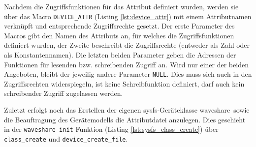 Nachdem die Zugriffsfunktionen für das Attribut definiert wurden, werden sie über das Macro \texttt{DEVICE\_ATTR} (Listing \ref{lst:device_attr}) mit einem Attributnamen verknüpft und entsprechende Zugriffsrechte gesetzt. Der erste Parameter des Macros gibt den Namen des Attributs an, für welches die Zugriffsfunktionen definiert wurden, der Zweite beschreibt die Zugriffsrechte (entweder als Zahl oder als Konstantennamen). Die letzten beiden Parameter geben die Adressen der Funktionen für lesenden bzw. schreibenden Zugriff an. Wird nur einer der beiden Angeboten, bleibt der jeweilig andere Parameter \texttt{NULL}. Dies muss sich auch in den Zugriffsrechten widerspiegeln, ist keine Schreibfunktion definiert, darf auch kein schreibender Zugriff zugelassen werden. 




Zuletzt erfolgt noch das Erstellen der eigenen sysfs-Geräteklasse \glqq waveshare\grqq~sowie die Beauftragung des Gerätemodells die Attributdatei anzulegen. Dies geschieht in der \texttt{waveshare_init} Funktion (Listing  \ref{lst:sysfs_class_create}) über \texttt{class\_create} und \texttt{device\_create\_file}.



